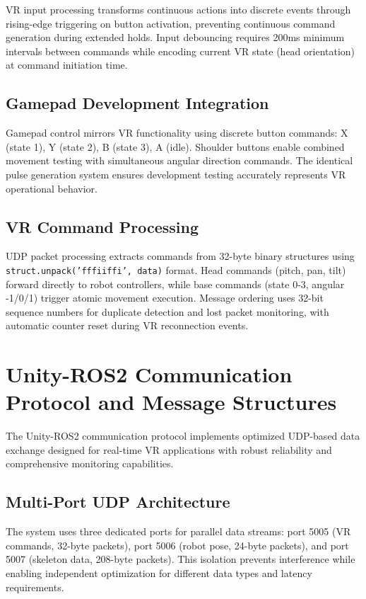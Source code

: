 VR input processing transforms continuous actions into discrete events through rising-edge triggering on button activation, preventing continuous command generation during extended holds. Input debouncing requires 200ms minimum intervals between commands while encoding current VR state (head orientation) at command initiation time.

\subsection{Gamepad Development Integration}

Gamepad control mirrors VR functionality using discrete button commands: X (state 1), Y (state 2), B (state 3), A (idle). Shoulder buttons enable combined movement testing with simultaneous angular direction commands. The identical pulse generation system ensures development testing accurately represents VR operational behavior.

\subsection{VR Command Processing}

UDP packet processing extracts commands from 32-byte binary structures using \texttt{struct.unpack('fffiiffi', data)} format. Head commands (pitch, pan, tilt) forward directly to robot controllers, while base commands (state 0-3, angular -1/0/1) trigger atomic movement execution. Message ordering uses 32-bit sequence numbers for duplicate detection and lost packet monitoring, with automatic counter reset during VR reconnection events.

\section{Unity-ROS2 Communication Protocol and Message Structures}

The Unity-ROS2 communication protocol implements optimized UDP-based data exchange designed for real-time VR applications with robust reliability and comprehensive monitoring capabilities.

\subsection{Multi-Port UDP Architecture}

The system uses three dedicated ports for parallel data streams: port 5005 (VR commands, 32-byte packets), port 5006 (robot pose, 24-byte packets), and port 5007 (skeleton data, 208-byte packets). This isolation prevents interference while enabling independent optimization for different data types and latency requirements.

